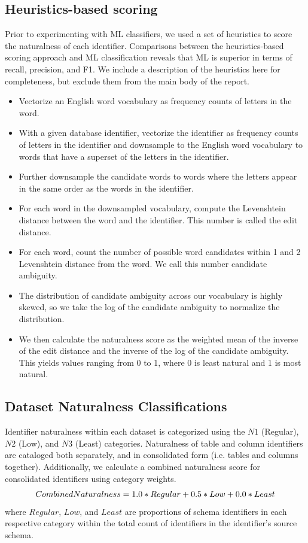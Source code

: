 \subsection{Heuristics-based scoring} 

Prior to experimenting with ML classifiers, we used a set of heuristics to score the naturalness of each identifier. 
Comparisons between the heuristics-based scoring approach and ML classification reveals that ML is superior in terms of recall, precision, and F1.
We include a description of the heuristics here for completeness, but exclude them from the main body of the report.

\begin{itemize}
  \item Vectorize an English word vocabulary as frequency counts of letters in the word.
  \item With a given database identifier, vectorize the identifier as frequency counts of letters in the identifier and downsample to the English word vocabulary to words that have a superset of the letters in the identifier.
  \item Further downsample the candidate words to words where the letters appear in the same order as the words in the identifier.
  \item For each word in the downsampled vocabulary, compute the Levenshtein distance between the word and the identifier. This number is called the edit distance.
  \item For each word, count the number of possible word candidates within 1 and 2 Levenshtein distance from the word. We call this number candidate ambiguity.
  \item The distribution of candidate ambiguity across our vocabulary is highly skewed, so we take the log of the candidate ambiguity to normalize the distribution.
  \item We then calculate the naturalness score as the weighted mean of the inverse of the edit distance and the inverse of the log of the candidate ambiguity. This yields values ranging from 0 to 1, where 0 is least natural and 1 is most natural.
\end{itemize}


\subsection{Dataset Naturalness Classifications}

Identifier naturalness within each dataset is categorized using the $N1$ (Regular), $N2$ (Low), and $N3$ (Least) categories.
Naturalness of table and column identifiers are cataloged both separately, and in consolidated form (i.e. tables and columns together).
Additionally, we calculate a combined naturalness score for consolidated identifiers using category weights.
\begin{equation}
  $$CombinedNaturalness = 1.0*Regular + 0.5*Low + 0.0*Least$$ 
  \label{equation:combined-naturalness}
\end{equation}
where $Regular$, $Low$, and $Least$ are proportions of schema identifiers in each respective category within the total count of identifiers in the identifier's source schema.

